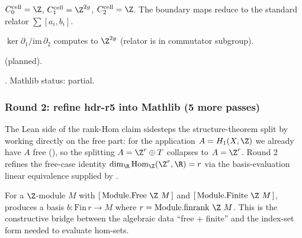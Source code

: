 \begin{lemma}
\label{lem:hdf-r7}
$C_{0}^{\mathrm{cell}} = \Z$, $C_{1}^{\mathrm{cell}} = \Z^{2g}$, $C_{2}^{\mathrm{cell}} = \Z$.  The boundary maps reduce to the standard relator $\sum [a_{i}, b_{i}]$.
\leanok
\end{lemma}

\begin{lemma}
\label{lem:hdf-r8}
$\ker\partial_{1}/\mathrm{im}\,\partial_{2}$ computes to $\Z^{2g}$ (relator is in commutator subgroup).
\leanok
\end{lemma}

\begin{lemma}
\label{lem:hdf-r9}
 (planned).
\leanok\mathlibok
\end{lemma}

\begin{lemma}
\label{lem:hdf-r10}
.  Mathlib status: partial.
\leanok
\end{lemma}

\subsubsection*{Round 2: refine hdr-r5 into Mathlib (5 more passes)}

The Lean side of the rank-Hom claim sidesteps the structure-theorem split by working directly on the free part: for the application $A = H_1(X,\Z)$ we already have $A$ free (), so the splitting $A = \Z^r \oplus T$ collapses to $A = \Z^r$.  Round 2 refines the free-case identity $\dim_\R \mathrm{Hom}_\Z(\Z^r, \R) = r$ via the basis-evaluation linear equivalence supplied by .

\begin{lemma}
\label{lem:hdr-r6}
For a $\Z$-module $M$ with $[\,\mathrm{Module.Free}\ \Z\ M\,]$ and $[\,\mathrm{Module.Finite}\ \Z\ M\,]$,  produces a basis $b : \mathrm{Fin}\,r \to M$ where $r = \mathrm{Module.finrank}\ \Z\ M$.  This is the constructive bridge between the algebraic data ``free + finite'' and the index-set form needed to evaluate hom-sets.
\leanok\mathlibok
\end{lemma}

